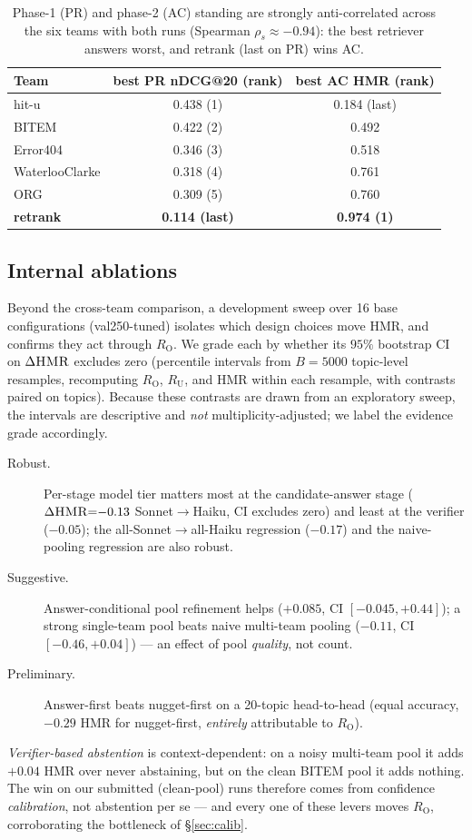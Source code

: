 \documentclass[sigconf,nonacm]{acmart}
\newcommand{\HMR}{\textsc{HMR}}
\newcommand{\RO}{R_{\mathrm{O}}}
\newcommand{\RU}{R_{\mathrm{U}}}
\begin{document}
\begin{table}[t]
\centering\small
\caption{Phase-1 (PR) and phase-2 (AC) standing are strongly anti-correlated across the six
teams with both runs (Spearman $\rho_s\approx-0.94$): the best retriever answers worst, and
retrank (last on PR) wins AC.}
\label{tab:prac}
\begin{tabular}{lcc}
\toprule
Team & best PR nDCG@20 (rank) & best AC \HMR{} (rank) \\
\midrule
hit-u & 0.438 (1) & 0.184 (last) \\
BITEM & 0.422 (2) & 0.492 \\
Error404 & 0.346 (3) & 0.518 \\
WaterlooClarke & 0.318 (4) & 0.761 \\
ORG & 0.309 (5) & 0.760 \\
\textbf{retrank} & \textbf{0.114 (last)} & \textbf{0.974 (1)} \\
\bottomrule
\end{tabular}
\end{table}

\subsection{Internal ablations}
\label{sec:ablations}
Beyond the cross-team comparison, a development sweep over 16 base configurations
(val250-tuned) isolates which design choices move \HMR{}, and confirms they act through
$\RO$. We grade each by whether its $95\%$ bootstrap CI on $\Delta\HMR{}$ excludes zero
(percentile intervals from $B{=}5000$ topic-level resamples, recomputing $\RO$, $\RU$, and
\HMR{} within each resample, with contrasts paired on topics). Because these contrasts are
drawn from an exploratory sweep, the intervals are descriptive and \emph{not}
multiplicity-adjusted; we label the evidence grade accordingly.
\begin{description}
  \item[Robust.] Per-stage model tier matters most at the candidate-answer stage
    ($\Delta\HMR{=}{-}0.13$ Sonnet$\to$Haiku, CI excludes zero) and least at the verifier
    ($-0.05$); the all-Sonnet$\to$all-Haiku regression ($-0.17$) and the naive-pooling
    regression are also robust.
  \item[Suggestive.] Answer-conditional pool refinement helps ($+0.085$, CI
    $[-0.045,+0.44]$); a strong single-team pool beats naive multi-team pooling
    ($-0.11$, CI $[-0.46,+0.04]$) --- an effect of pool \emph{quality}, not count.
  \item[Preliminary.] Answer-first beats nugget-first on a 20-topic head-to-head (equal
    accuracy, $-0.29$ \HMR{} for nugget-first, \emph{entirely} attributable to $\RO$).
\end{description}
\noindent \emph{Verifier-based abstention} is context-dependent: on a noisy multi-team pool
it adds $+0.04$ \HMR{} over never abstaining, but on the clean BITEM pool it adds nothing.
The win on our submitted (clean-pool) runs therefore comes from confidence \emph{calibration},
not abstention per se --- and every one of these levers moves $\RO$, corroborating the
bottleneck of \S\ref{sec:calib}.
\end{document}

